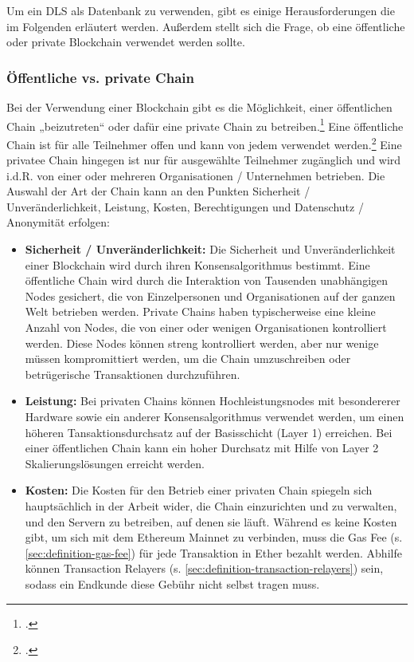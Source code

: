 \documentclass[12pt, a4paper]{article}
\begin{document}
{\noindent
Um ein DLS als Datenbank zu verwenden, gibt es einige Herausforderungen die im Folgenden erläutert werden.
Außerdem stellt sich die Frage, ob eine öffentliche oder private Blockchain verwendet werden sollte.
\noindent

\subsubsection{Öffentliche vs. private Chain}
\label{sec:oeffentlich-vs-privates-netzwerk}

Bei der Verwendung einer Blockchain gibt es die Möglichkeit, einer öffentlichen Chain „beizutreten“ oder dafür eine private Chain zu betreiben.\footcite[Vgl.][]{w10}
Eine öffentliche Chain ist für alle Teilnehmer offen und kann von jedem verwendet werden.\footcite[Vgl. hierzu und zum Folgenden][]{w11}
Eine privatee Chain hingegen ist nur für ausgewählte Teilnehmer zugänglich und wird i.d.R. von einer oder mehreren Organisationen / Unternehmen betrieben.
Die Auswahl der Art der Chain kann an den Punkten Sicherheit / Unveränderlichkeit, Leistung, Kosten, Berechtigungen und Datenschutz / Anonymität erfolgen:
\begin{itemize}
    \item \textbf{Sicherheit / Unveränderlichkeit:} 
    Die Sicherheit und Unveränderlichkeit einer Blockchain wird durch ihren Konsensalgorithmus bestimmt. 
    Eine öffentliche Chain wird durch die Interaktion von Tausenden unabhängigen Nodes gesichert, die von Einzelpersonen und Organisationen auf der ganzen Welt betrieben werden. 
    Private Chains haben typischerweise eine kleine Anzahl von Nodes, die von einer oder wenigen Organisationen kontrolliert werden. 
    Diese Nodes können streng kontrolliert werden, aber nur wenige müssen kompromittiert werden, um die Chain umzuschreiben oder betrügerische Transaktionen durchzuführen.

    \item \textbf{Leistung:} 
    Bei privaten Chains können Hochleistungsnodes mit besondererer Hardware sowie ein anderer Konsensalgorithmus verwendet werden, um einen höheren Tansaktionsdurchsatz auf der Basisschicht (Layer 1) erreichen.
    Bei einer öffentlichen Chain kann ein hoher Durchsatz mit Hilfe von Layer 2 Skalierungslösungen erreicht werden.

    \item  \textbf{Kosten:}
    Die Kosten für den Betrieb einer privaten Chain spiegeln sich hauptsächlich in der Arbeit wider, die Chain einzurichten und zu verwalten, und den Servern zu betreiben, auf denen sie läuft. 
    Während es keine Kosten gibt, um sich mit dem Ethereum Mainnet zu verbinden, muss die Gas Fee (s. \ref{sec:definition-gas-fee}) für jede Transaktion in Ether bezahlt werden.
    Abhilfe können Transaction Relayers (s. \ref{sec:definition-transaction-relayers}) sein, sodass ein Endkunde diese Gebühr nicht selbst tragen muss.


\end{itemize}}
\end{document}
